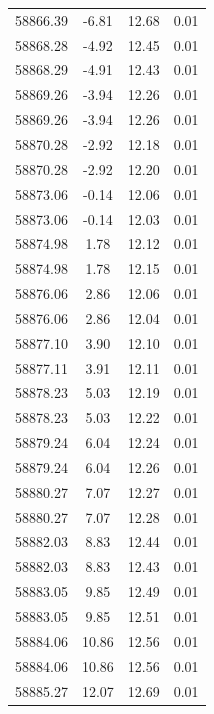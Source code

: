 \begin{longtable}{|c|c|c|c|}
 58866.39 &   -6.81 &       12.68 &          0.01 \\
 58868.28 &   -4.92 &       12.45 &          0.01 \\
 58868.29 &   -4.91 &       12.43 &          0.01 \\
 58869.26 &   -3.94 &       12.26 &          0.01 \\
 58869.26 &   -3.94 &       12.26 &          0.01 \\
 58870.28 &   -2.92 &       12.18 &          0.01 \\
 58870.28 &   -2.92 &       12.20 &          0.01 \\
 58873.06 &   -0.14 &       12.06 &          0.01 \\
 58873.06 &   -0.14 &       12.03 &          0.01 \\
 58874.98 &    1.78 &       12.12 &          0.01 \\
 58874.98 &    1.78 &       12.15 &          0.01 \\
 58876.06 &    2.86 &       12.06 &          0.01 \\
 58876.06 &    2.86 &       12.04 &          0.01 \\
 58877.10 &    3.90 &       12.10 &          0.01 \\
 58877.11 &    3.91 &       12.11 &          0.01 \\
 58878.23 &    5.03 &       12.19 &          0.01 \\
 58878.23 &    5.03 &       12.22 &          0.01 \\
 58879.24 &    6.04 &       12.24 &          0.01 \\
 58879.24 &    6.04 &       12.26 &          0.01 \\
 58880.27 &    7.07 &       12.27 &          0.01 \\
 58880.27 &    7.07 &       12.28 &          0.01 \\
 58882.03 &    8.83 &       12.44 &          0.01 \\
 58882.03 &    8.83 &       12.43 &          0.01 \\
 58883.05 &    9.85 &       12.49 &          0.01 \\
 58883.05 &    9.85 &       12.51 &          0.01 \\
 58884.06 &   10.86 &       12.56 &          0.01 \\
 58884.06 &   10.86 &       12.56 &          0.01 \\
 58885.27 &   12.07 &       12.69 &          0.01 \\

\end{longtable}
